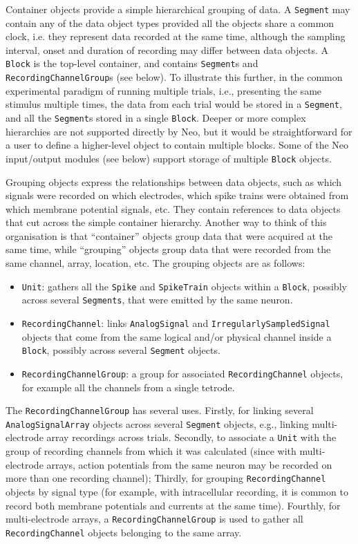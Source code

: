 \documentclass{frontiers}
\begin{document}
Container objects provide a simple hierarchical grouping of data. 
A \lstinline`Segment` may contain any of the data object types provided all the objects share a common clock, i.e. they represent data recorded at the same time, although the sampling interval, onset and duration of recording may differ between data objects.
A \lstinline`Block` is the top-level container, and contains \lstinline`Segment`s and \lstinline`RecordingChannelGroup`s (see below).
To illustrate this further, in the common experimental paradigm of running multiple trials, i.e., presenting the same stimulus multiple times, the data from each trial would be stored in a \lstinline`Segment`, and all the \lstinline`Segment`s stored in a single \lstinline`Block`. Deeper or more complex hierarchies are not supported directly by Neo, but it would be straightforward for a user to define a higher-level object to contain multiple blocks. Some of the Neo input/output modules (see below) support storage of multiple \lstinline`Block` objects.

Grouping objects express the relationships between data objects, such as which signals were recorded on which electrodes, which spike trains were obtained from which membrane potential signals, etc.
They contain references to data objects that cut across the simple container hierarchy. Another way to think of this organisation is that ``container'' objects group data that were acquired at the same time, while ``grouping'' objects group data that were recorded from the same channel, array, location, etc. 
The grouping objects are as follows:

\begin{itemize}
\item \lstinline`Unit`: gathers all the \lstinline`Spike` and \lstinline`SpikeTrain` objects within a \lstinline`Block`, possibly across several \lstinline`Segments`, that were emitted by the same neuron.
\item \lstinline`RecordingChannel`: links \lstinline`AnalogSignal` and \lstinline`IrregularlySampledSignal` objects that come from the same logical and/or physical channel inside a \lstinline`Block`, possibly across several \lstinline`Segment` objects.
\item \lstinline`RecordingChannelGroup`: a group for associated \lstinline`RecordingChannel` objects, for example all the channels from a single tetrode.
\end{itemize}

The  \lstinline`RecordingChannelGroup` has several uses. 
Firstly, for linking several \lstinline`AnalogSignalArray` objects across several \lstinline`Segment` objects, e.g., linking multi-electrode array recordings across trials.
Secondly, to associate a \lstinline`Unit` with the group of recording channels from which it was calculated (since with multi-electrode arrays, action potentials from the same neuron may be recorded on more than one recording channel);
Thirdly, for grouping \lstinline`RecordingChannel` objects by signal type (for example, with intracellular recording, it is common to record both membrane potentials and currents at the same time).
Fourthly, for multi-electrode arrays, a \lstinline`RecordingChannelGroup` is used to gather all \lstinline`RecordingChannel` objects belonging to the same array.
\end{document}
